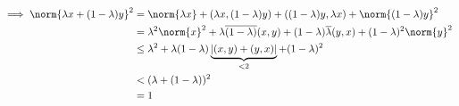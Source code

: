 \begin{solution}
\begin{enumerate}[label = \arabic*.]
\end{enumerate}

\begin{align*}
    \implies
    \norm{\lambda x + (1 - \lambda) y}^2
    & =
    \norm{\lambda x}
    +
    (\lambda x, (1 - \lambda) y)
    +
    ((1 - \lambda) y, \lambda x)
    +
    \norm{(1 - \lambda) y}^2 \\
    & =
    \lambda^2 \norm{x}^2
    +
    \lambda \overline{(1 - \lambda)} (x, y)
    +
    (1 - \lambda) \overline \lambda (y, x)
    +
    (1 - \lambda)^2 \norm{y}^2 \\
    & \leq
    \lambda^2
    +
    \lambda (1 - \lambda)
    \underbrace
    {
        |(x, y) + (y, x)|
    }_{
        < 2
    }
    +
    (1 - \lambda)^2 \\
    & <
    (
        \lambda
        +
        (1 - \lambda)
    )^2 \\
    & =
    1
\end{align*}

\end{solution}

